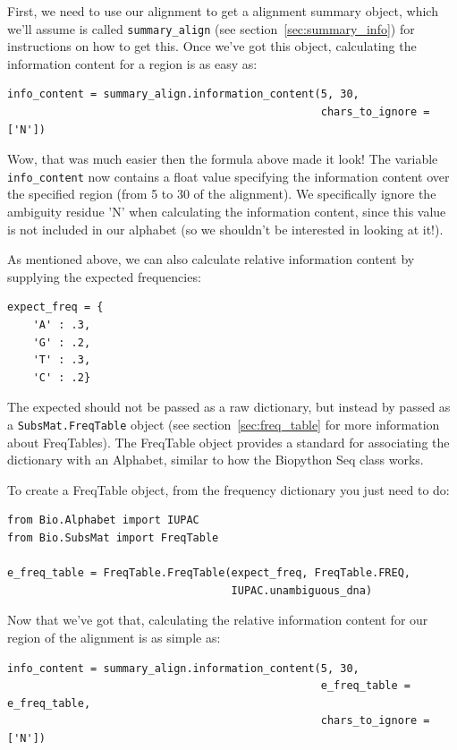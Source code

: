\documentclass{report}
\begin{document}
First, we need to use our alignment to get a alignment summary object, which we'll assume is called \verb|summary_align| (see section~\ref{sec:summary_info}) for instructions on how to get this. Once we've got this object, calculating the information content for a region is as easy as:

\begin{verbatim}
info_content = summary_align.information_content(5, 30, 
                                                 chars_to_ignore = ['N'])
\end{verbatim}

Wow, that was much easier then the formula above made it look! The variable \verb|info_content| now contains a float value specifying the information content over the specified region (from 5 to 30 of the alignment). We specifically ignore the ambiguity residue 'N' when calculating the information content, since this value is not included in our alphabet (so we shouldn't be interested in looking at it!).


As mentioned above, we can also calculate relative information content by supplying the expected frequencies:

\begin{verbatim}
expect_freq = {
    'A' : .3,
    'G' : .2,
    'T' : .3,
    'C' : .2}
\end{verbatim}

The expected should not be passed as a raw dictionary, but instead by passed as a \verb|SubsMat.FreqTable| object (see section~\ref{sec:freq_table} for more information about FreqTables). The FreqTable object provides a standard for associating the dictionary with an Alphabet, similar to how the Biopython Seq class works. 


To create a FreqTable object, from the frequency dictionary you just need to do:

\begin{verbatim}
from Bio.Alphabet import IUPAC
from Bio.SubsMat import FreqTable

e_freq_table = FreqTable.FreqTable(expect_freq, FreqTable.FREQ,
                                   IUPAC.unambiguous_dna)
\end{verbatim}

Now that we've got that, calculating the relative information content for our region of the alignment is as simple as:


\begin{verbatim}
info_content = summary_align.information_content(5, 30,
                                                 e_freq_table = e_freq_table,
                                                 chars_to_ignore = ['N'])
\end{verbatim}
\end{document}
